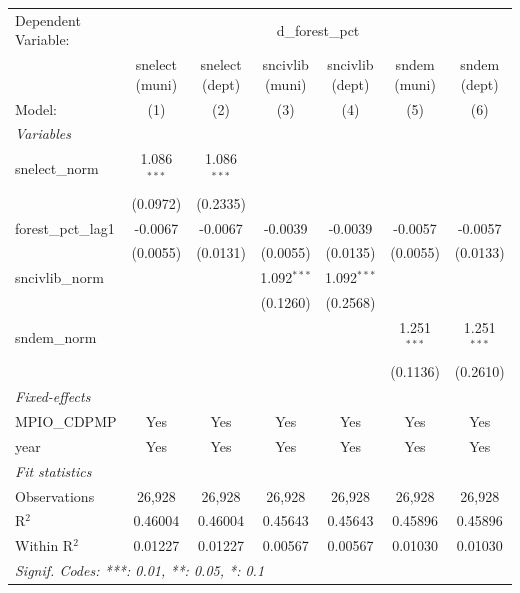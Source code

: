 
\begingroup
\centering
\begin{tabular}{lcccccc}
   \tabularnewline \midrule \midrule
   Dependent Variable: & \multicolumn{6}{c}{d\_forest\_pct}\\
                       & snelect (muni) & snelect (dept) & sncivlib (muni) & sncivlib (dept) & sndem (muni)  & sndem (dept) \\   
   Model:              & (1)            & (2)            & (3)             & (4)             & (5)           & (6)\\  
   \midrule
   \emph{Variables}\\
   snelect\_norm       & 1.086$^{***}$  & 1.086$^{***}$  &                 &                 &               &   \\   
                       & (0.0972)       & (0.2335)       &                 &                 &               &   \\   
   forest\_pct\_lag1   & -0.0067        & -0.0067        & -0.0039         & -0.0039         & -0.0057       & -0.0057\\   
                       & (0.0055)       & (0.0131)       & (0.0055)        & (0.0135)        & (0.0055)      & (0.0133)\\   
   sncivlib\_norm      &                &                & 1.092$^{***}$   & 1.092$^{***}$   &               &   \\   
                       &                &                & (0.1260)        & (0.2568)        &               &   \\   
   sndem\_norm         &                &                &                 &                 & 1.251$^{***}$ & 1.251$^{***}$\\   
                       &                &                &                 &                 & (0.1136)      & (0.2610)\\   
   \midrule
   \emph{Fixed-effects}\\
   MPIO\_CDPMP         & Yes            & Yes            & Yes             & Yes             & Yes           & Yes\\  
   year                & Yes            & Yes            & Yes             & Yes             & Yes           & Yes\\  
   \midrule
   \emph{Fit statistics}\\
   Observations        & 26,928         & 26,928         & 26,928          & 26,928          & 26,928        & 26,928\\  
   R$^2$               & 0.46004        & 0.46004        & 0.45643         & 0.45643         & 0.45896       & 0.45896\\  
   Within R$^2$        & 0.01227        & 0.01227        & 0.00567         & 0.00567         & 0.01030       & 0.01030\\  
   \midrule \midrule
   \multicolumn{7}{l}{\emph{Signif. Codes: ***: 0.01, **: 0.05, *: 0.1}}\\
\end{tabular}
\par\endgroup


